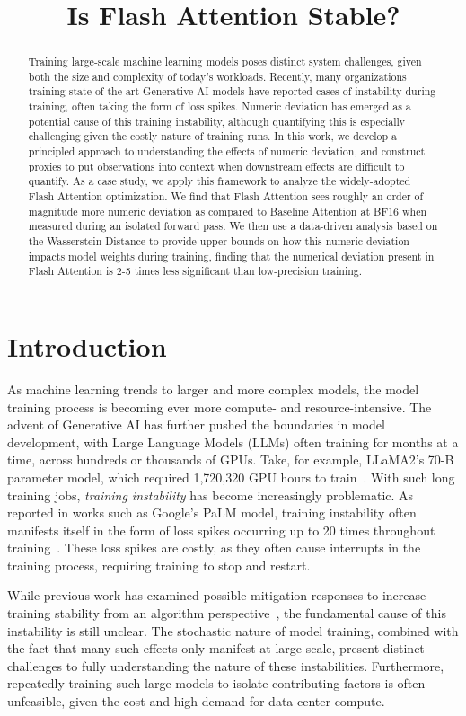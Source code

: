 \title{Is Flash Attention Stable?}

\begin{abstract}
Training large-scale machine learning models poses distinct system challenges, given both the size and complexity of today's workloads. Recently, many organizations training state-of-the-art Generative AI models have reported cases of instability during training, often taking the form of loss spikes. Numeric deviation has emerged as a potential cause of this training instability, although quantifying this is especially challenging given the costly nature of training runs. In this work, we develop a principled approach to understanding the effects of numeric deviation, and construct proxies to put observations into context when downstream effects are difficult to quantify. As a case study, we apply this framework to analyze the widely-adopted Flash Attention optimization. We find that Flash Attention sees roughly an order of magnitude more numeric deviation as compared to Baseline Attention at BF16 when measured during an isolated forward pass. We then use a data-driven analysis based on the Wasserstein Distance to provide upper bounds on how this numeric deviation impacts model weights during training, finding that the numerical deviation present in Flash Attention is 2-5 times less significant than low-precision training.
\end{abstract}

\section{Introduction}
As machine learning trends to larger and more complex models, the model training process is becoming ever more compute- and resource-intensive. The advent of Generative AI has further pushed the boundaries in model development, with Large Language Models (LLMs) often training for months at a time, across hundreds or thousands of GPUs. Take, for example, LLaMA2's 70-B parameter model, which required 1,720,320 GPU hours to train~\cite{touvron2023llama2}. With such long training jobs, \textit{training instability} has become increasingly problematic. As reported in works such as Google's PaLM model, training instability often manifests itself in the form of loss spikes occurring up to 20 times throughout training~\cite{chowdhery2022palm}. These loss spikes are costly, as they often cause interrupts in the training process, requiring training to stop and restart.

While previous work has examined possible mitigation responses to increase training stability from an algorithm perspective~\cite{molybog2023theory, liu2023understanding, NEURIPS2022_7b97adea, gilmer2021loss}, the fundamental cause of this instability is still unclear. The stochastic nature of model training, combined with the fact that many such effects only manifest at large scale, present distinct challenges to fully understanding the nature of these instabilities. Furthermore, repeatedly training such large models to isolate contributing factors is often unfeasible, given the cost and high demand for data center compute. 


